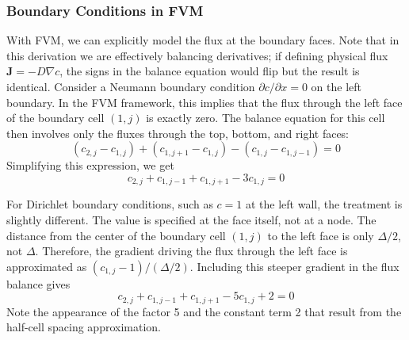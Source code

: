 \subsubsection{Boundary Conditions in FVM}

With FVM, we can explicitly model the flux at the boundary faces. Note that in this derivation we are effectively balancing derivatives; if defining physical flux $\mathbf{J}=-D\nabla c$, the signs in the balance equation would flip but the result is identical. Consider a Neumann boundary condition $\partial c / \partial x = 0$ on the left boundary. In the FVM framework, this implies that the flux through the left face of the boundary cell $(1,j)$ is exactly zero. The balance equation for this cell then involves only the fluxes through the top, bottom, and right faces:
\begin{equation}
    (c_{2,j} - c_{1,j}) + (c_{1,j+1} - c_{1,j}) - (c_{1,j} - c_{1,j-1}) = 0
\end{equation}
Simplifying this expression, we get
\begin{equation}
    c_{2,j} + c_{1,j-1} + c_{1,j+1} - 3c_{1,j} = 0
\end{equation}

For Dirichlet boundary conditions, such as $c=1$ at the left wall, the treatment is slightly different. The value is specified at the face itself, not at a node. The distance from the center of the boundary cell $(1,j)$ to the left face is only $\Delta/2$, not $\Delta$. Therefore, the gradient driving the flux through the left face is approximated as $(c_{1,j} - 1) / (\Delta/2)$. Including this steeper gradient in the flux balance gives
\begin{equation}
    c_{2,j} + c_{1,j-1} + c_{1,j+1} - 5c_{1,j} + 2 = 0
\end{equation}
Note the appearance of the factor 5 and the constant term 2 that result from the half-cell spacing approximation.

